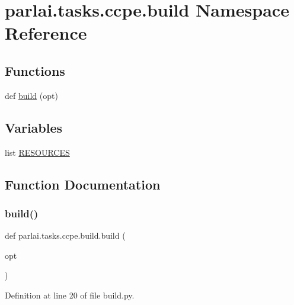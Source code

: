 \hypertarget{namespaceparlai_1_1tasks_1_1ccpe_1_1build}{}\section{parlai.\+tasks.\+ccpe.\+build Namespace Reference}
\label{namespaceparlai_1_1tasks_1_1ccpe_1_1build}
\subsection*{Functions}
\begin{DoxyCompactItemize}
\item 
def \hyperlink{namespaceparlai_1_1tasks_1_1ccpe_1_1build_a3c36666a37a2334071b6372b999d94ca}{build} (opt)
\end{DoxyCompactItemize}
\subsection*{Variables}
\begin{DoxyCompactItemize}
\item 
list \hyperlink{namespaceparlai_1_1tasks_1_1ccpe_1_1build_a5df2747fef648c490cbe2ac949f6648e}{R\+E\+S\+O\+U\+R\+C\+ES}
\end{DoxyCompactItemize}


\subsection{Function Documentation}
\mbox{\label{namespaceparlai_1_1tasks_1_1ccpe_1_1build_a3c36666a37a2334071b6372b999d94ca}} 
\subsubsection{\texorpdfstring{build()}{build()}}
{\footnotesize\ttfamily def parlai.\+tasks.\+ccpe.\+build.\+build (\begin{DoxyParamCaption}\item[{}]{opt }\end{DoxyParamCaption})}



Definition at line 20 of file build.\+py.


